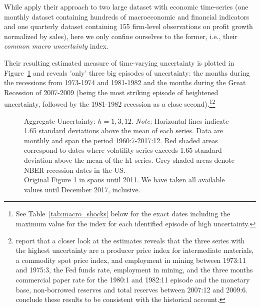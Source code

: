\documentclass[a4paper,12pt,oneside,pointednumbers,bibtotoc,bigheadings,liststotoc]{scrbook}
\begin{document}
While \citet{juradoetal:15} apply their approach to two large dataset with economic time-series (one monthly dataset containing hundreds of macroeconomic and financial indicators and one quarterly dataset containing 155 firm-level observations on profit growth normalized by sales), here we only confine ourselves to the former, i.e., their \textit{common macro uncertainty} index.

Their resulting estimated measure of time-varying uncertainty is plotted in Figure~\ref{fig:macroUncertainty_index} and reveals 'only' three big episodes of uncertainty: the months during the recessions from 1973-1974 and 1981-1982 and the months during the Great Recession of 2007-2009 (being the most striking episode of heightened uncertainty, followed by the 1981-1982 recession as a close second).\footnote{See Table~\ref{tab:macro_shocks} below for the exact dates including the maximum value for the index for each identified episode of high uncertainty.}\footnote{\citet{juradoetal:15} report that a closer look at the estimates reveals that the three series with the highest uncertainty are a producer price index for intermediate materials, a commodity spot price index, and employment in mining between 1973:11 and 1975:3, the Fed funds rate, employment in mining, and the three months commercial paper rate for the 1980:1 and 1982:11 episode and the monetary base, non-borrowed reserves and total reserves between 2007:12 and 2009:6. \citet{juradoetal:15} conclude these results to be consistent with the historical account.}

\begin{figure}[!ht]
   \centering
   \setlength\fboxsep{0pt}
   \setlength\fboxrule{0pt}
      \caption[Aggregate Uncertainty: $h = 1, 3, 12$.]{Aggregate Uncertainty: $h = 1, 3, 12$.
      \textit{Note:} Horizontal lines indicate 1.65 standard deviations above the mean of each series. Data are monthly and span the period 1960:7-2017:12. Red shaded areas correspond to dates where volatility series exceeds 1.65 standard deviation above the mean of the h1-series. Grey shaded areas denote NBER recession dates in the US.\\
      Original Figure 1 in \citet{juradoetal:15} spans until 2011. We have taken all available values until December 2017, inclusive.}   \label{fig:macroUncertainty_index}
\end{figure}
\end{document}
